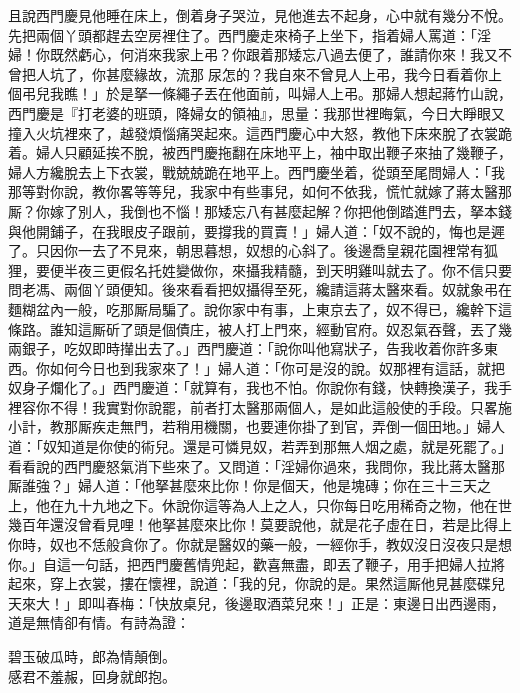且說西門慶見他睡在床上，倒着身子哭泣，{}見他進去不起身，心中就有幾分不悅。先把兩個丫頭都趕去空房裡住了。西門慶走來椅子上坐下，指着婦人罵道：「淫婦！你既然虧心，何消來我家上弔？你跟着那矮忘八過去便了，誰請你來！我又不曾把人坑了，你甚麼緣故，流那𣭈尿怎的？我自來不曾見人上弔，我今日看着你上個弔兒我瞧！」於是拏一條繩子丟在他面前，叫婦人上弔。那婦人想起蔣竹山說，西門慶是『打老婆的班頭，降婦女的領袖』，思量：我那世裡晦氣，今日大睜眼又撞入火坑裡來了，越發煩惱痛哭起來。{}這西門慶心中大怒，教他下床來脫了衣裳跪着。婦人只顧延挨不脫，被西門慶拖翻在床地平上，袖中取出鞭子來抽了幾鞭子，{}婦人方纔脫去上下衣裳，戰兢兢跪在地平上。西門慶坐着，從頭至尾問婦人：「我那等對你說，教你畧等等兒，我家中有些事兒，如何不依我，慌忙就嫁了蔣太醫那厮？你嫁了別人，我倒也不惱！那矮忘八有甚麼起解？你把他倒踏進門去，拏本錢與他開鋪子，在我眼皮子跟前，要撐我的買賣！」婦人道：「奴不說的，悔也是遲了。只因你一去了不見來，朝思暮想，奴想的心斜了。後邊喬皇親花園裡常有狐狸，要便半夜三更假名托姓變做你，來攝我精髓，到天明雞叫就去了。你不信只要問老馮、兩個丫頭便知。後來看看把奴攝得至死，纔請這蔣太醫來看。奴就象弔在麵糊盆內一般，吃那厮局騙了。說你家中有事，上東京去了，奴不得已，纔幹下這條路。誰知這厮斫了頭是個債庄，被人打上門來，經動官府。奴忍氣吞聲，丟了幾兩銀子，吃奴即時攆出去了。」{}西門慶道：「說你叫他寫狀子，告我收着你許多東西。{}你如何今日也到我家來了！」婦人道：「你可是沒的說。奴那裡有這話，就把奴身子爛化了。」西門慶道：「就算有，我也不怕。你說你有錢，快轉換漢子，我手裡容你不得！我實對你說罷，前者打太醫那兩個人，是如此這般使的手段。只畧施小計，教那厮疾走無門，若稍用機關，也要連你掛了到官，弄倒一個田地。」婦人道：「奴知道是你使的術兒。還是可憐見奴，若弄到那無人烟之處，就是死罷了。」看看說的西門慶怒氣消下些來了。又問道：「淫婦你過來，我問你，我比蔣太醫那厮誰強？」{}婦人道：「他拏甚麼來比你！你是個天，他是塊磚；你在三十三天之上，他在九十九地之下。休說你這等為人上之人，只你每日吃用稀奇之物，他在世幾百年還沒曾看見哩！他拏甚麼來比你！莫要說他，就是花子虛在日，若是比得上你時，奴也不恁般貪你了。{}你就是醫奴的藥一般，一經你手，教奴沒日沒夜只是想你。」自這一句話，把西門慶舊情兜起，歡喜無盡，即丟了鞭子，用手把婦人拉將起來，穿上衣裳，摟在懷裡，說道：「我的兒，你說的是。果然這厮他見甚麼碟兒天來大！」即叫春梅：「快放桌兒，後邊取酒菜兒來！」正是：東邊日出西邊雨，道是無情卻有情。有詩為證：

\begin{myquote} 
碧玉破瓜時，郎為情顛倒。\\感君不羞赧，回身就郎抱。
\end{myquote} 

 

